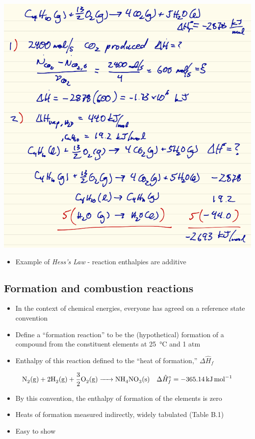\documentclass[11pt]{article}
\begin{document}
\includegraphics[width=.9\linewidth]{./figs/RxnEnthalpy.png}

\begin{itemize}
\item Example of \emph{Hess's Law} - reaction enthalpies are additive
\end{itemize}
\subsection{Formation and combustion reactions}
\label{sec-11-2}
\begin{itemize}
\item In the context of chemical energies, everyone has agreed on a reference state convention
\item Define a ``formation reaction'' to be the (hypothetical) formation of a compound from the constituent elements at \SI{25}{\celsius} and 1 atm
\item Enthalpy of this reaction defined to the  ``heat of formation,'' \(\Delta \hat{H}_{f}\)
\end{itemize}

\[\ce{N2(g) + 2 H2(g) + 3/2 O2 (g) -> NH4NO3 (s)}\quad\Delta \hat{H}^{\circ}_{f}= \SI{-365.14}{\kilo\joule\per\mole}\]

\begin{itemize}
\item By this convention, the enthalpy of formation of the elements is zero
\item Heats of formation measured indirectly, widely tabulated (Table B.1)
\item Easy to show
\end{itemize}
\end{document}
